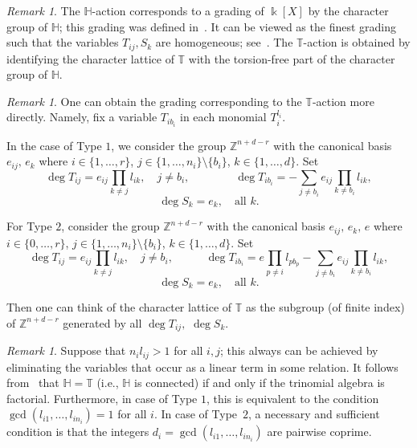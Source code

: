 \documentclass[a4paper,reqno,12pt]{amsart}
\theoremstyle{plain}
\theoremstyle{definition}
\theoremstyle{plain}
\theoremstyle{remark}
\newtheorem{remark}[theorem]{Remark}
\newcommand{\TT}{\mathbb{T}}
\newcommand{\ZZ}{\mathbb Z}
\newcommand{\kk}{\Bbbk}
\newcommand{\HH}{\mathbb H}
\begin{document}
\begin{remark}
The $\HH$-action corresponds to a grading of $\kk[X]$ by the character group of $\HH$; this grading was defined in~\cite[Construction~1.1]{HW}. It can be viewed as the finest grading such that the variables $T_{ij}, S_k$ are homogeneous; see~\cite[Lemma~1]{Z}. The ${\TT}$-action is obtained by identifying the character lattice of ${\TT}$ with the torsion-free part of the character group of $\HH$.
\end{remark}
\begin{remark}\label{RemarkAct}
One can obtain the grading corresponding to the ${\TT}$-action more directly. Namely, fix a variable $T_{ib_i}$ in each monomial $T_i^{l_i}$.

In the case of Type $1$, we consider the group $\ZZ^{n+d-r}$ with the canonical basis $e_{ij}, \,e_k$ where $i\in\{1,\ldots, r\}$, $j\in\{1,\ldots, n_i\}\setminus \{b_i\}$, $k\in\{1,\ldots, d\}$. Set
 $$
    \deg T_{ij}=e_{ij}\prod_{k\neq j} l_{ik}, \quad j\neq b_i, \qquad\qquad\deg T_{ib_i} = -\sum_{j\neq b_i}e_{ij}\prod_{k\neq b_i} l_{ik},$$    
    $$
    \deg S_k=e_k,\quad\mbox{all $k$}.
    $$

    For Type $2$, consider the group $\mathbb Z^{n+d-r}$ with the canonical basis $e_{ij}, \,e_k,\, e$ where $i\in\{0,\ldots, r\}$, $j\in\{1,\ldots, n_i\}\setminus \{b_i\}$, $k\in\{1,\ldots, d\}$. 
    Set
    $$
    \deg T_{ij}=e_{ij}\prod_{k\neq j} l_{ik}, \quad\mbox{$j\neq b_i$,}\quad\qquad\deg T_{ib_i} = e\prod_{p\neq i} l_{pb_p}-\sum_{j\neq b_i}e_{ij}\prod_{k\neq b_i} l_{ik}, $$$$
    \deg S_k=e_k,\quad\mbox{all $k$}.
    $$

    Then one can think of the character lattice of ${\TT}$ as the subgroup (of finite index) of $\mathbb Z^{n+d-r}$ generated by all $\deg T_{ij},$ $ \deg S_k$.
\end{remark}
\begin{remark} 
Suppose that $n_il_{ij}>1$ for all $i,j$; this always can be achieved by eliminating the variables that occur as a linear term in some relation. It follows from~\cite[Theorem 1.2\,$(iv)$]{HW} that $\HH=\mathbb T$ (i.e., $\HH$ is connected) if and only if the trinomial algebra is factorial. Furthermore, in case of Type $1$, this is equivalent to the condition $\gcd(l_{i1},\ldots,l_{in_i})=1$ for all $i$. In case of Type~$2$, a necessary and sufficient condition is that the integers $d_i=\gcd(l_{i1},\ldots,l_{in_i})$ are pairwise coprime.
\end{remark}
\end{document}
